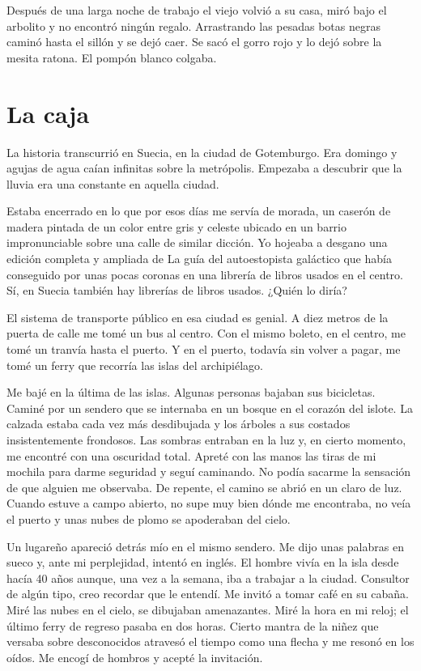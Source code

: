 \documentclass[11pt,twoside,openright,a6paper]{book}
\begin{document}
Después de una larga noche de trabajo el viejo volvió a su casa, miró bajo el arbolito y no encontró ningún regalo. Arrastrando las pesadas botas negras caminó hasta el sillón y se dejó caer. Se sacó el gorro rojo y lo dejó sobre la mesita ratona. El pompón blanco colgaba.

\chapter*{La caja}

La historia transcurrió en Suecia, en la ciudad de Gotemburgo. Era domingo y agujas de agua caían infinitas sobre la metrópolis. Empezaba a descubrir que la lluvia era una constante en aquella ciudad.

Estaba encerrado en lo que por esos días me servía de morada, un caserón de madera pintada de un color entre gris y celeste ubicado en un barrio impronunciable sobre una calle de similar dicción. Yo hojeaba a desgano una edición completa y ampliada de La guía del autoestopista galáctico que había conseguido por unas pocas coronas en una librería de libros usados en el centro. Sí, en Suecia también hay librerías de libros usados. ¿Quién lo diría?

El sistema de transporte público en esa ciudad es genial.  A diez metros de la puerta de calle me tomé un bus al centro. Con el mismo boleto, en el centro, me tomé un tranvía hasta el puerto. Y en el puerto, todavía sin volver a pagar, me tomé un ferry que recorría las islas del archipiélago.

Me bajé en la última de las islas. Algunas personas bajaban sus bicicletas. Caminé por un sendero que se internaba en un bosque en el corazón del islote. La calzada estaba cada vez más desdibujada y los árboles a sus costados insistentemente frondosos. Las sombras entraban en la luz y, en cierto momento, me encontré con una oscuridad total. Apreté con las manos las tiras de mi mochila para darme seguridad y seguí caminando. No podía sacarme la sensación de que alguien me observaba. De repente, el camino se abrió en un claro de luz. Cuando estuve a campo abierto, no supe muy bien dónde me encontraba, no veía el puerto y unas nubes de plomo se apoderaban del cielo.

Un lugareño apareció detrás mío en el mismo sendero. Me dijo unas palabras en sueco y, ante mi perplejidad, intentó en inglés. El hombre vivía en la isla desde hacía 40 años aunque, una vez a la semana, iba a trabajar a la ciudad. Consultor de algún tipo, creo recordar que le entendí. Me invitó a tomar café en su cabaña. Miré las nubes en el cielo, se dibujaban amenazantes. Miré la hora en mi reloj; el último ferry de regreso pasaba en dos horas. Cierto mantra de la niñez que versaba sobre desconocidos atravesó el tiempo como una flecha y me resonó en los oídos. Me encogí de hombros y acepté la invitación.
\end{document}
